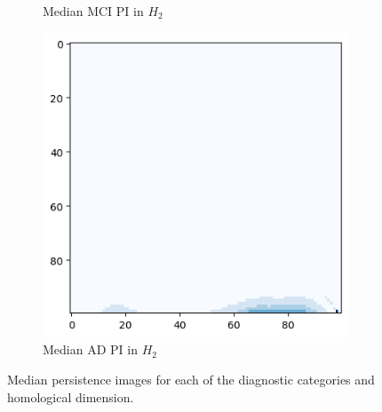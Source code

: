 \documentclass{article}
\begin{document}
\begin{figure}
\begin{subfigure}{0.32\textwidth}
    \caption{Median MCI PI in $H_2$}
  \end{subfigure}
  \begin{subfigure}{0.32\textwidth}
    \includegraphics[width=\textwidth]{figures/median_pls/median_pi_AD_h_2.png}
    \caption{Median AD PI in $H_2$}
  \end{subfigure}
  \caption{Median persistence images for each of the diagnostic categories and homological
    dimension.}
  \label{fig:median_pis}
\end{figure}
\end{document}
